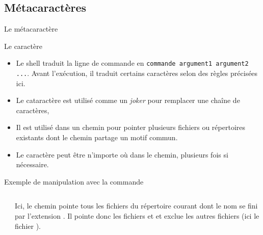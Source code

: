 \subsection{Métacaractères}
\begin{frame}{Le métacaractère \lin{*}}
  \begin{block}{Le caractère \lin{*}}
    \begin{itemize}
    \item[\ddialogsystem] Le shell traduit la ligne de commande en \texttt{commande argument1
        argument2 ...}. Avant l'exécution, il traduit certains caractères
      selon des règles précisées ici.
    \item Le cataractère \lin{*} est utilisé comme un \textit{joker}
      pour remplacer une chaîne de caractères,
    \item Il est utilisé dans un chemin pour pointer plusieurs fichiers
      ou répertoires existants dont le chemin partage un motif commun.
    \item Le caractère \lin{*} peut être n'importe où dans le chemin,
      plusieurs fois si nécessaire.
    \end{itemize}
  \end{block}
  \begin{block}{Exemple de manipulation avec la commande }
    \scriptsize{
      \begin{columns}
        \begin{column}{6cm}
          \begin{center}
          \end{center}
        \end{column}
        \begin{column}{6cm}
          Ici, le chemin  pointe tous les fichiers du
          répertoire courant dont le nom se fini par l'extension
          . Il pointe donc les fichiers 
          et  et exclue les autres fichiers (ici le
          fichier ).
        \end{column}
      \end{columns}
      \begin{columns}
        \begin{column}{6cm}
\end{column}
\end{columns}}
\end{block}
\end{frame}
